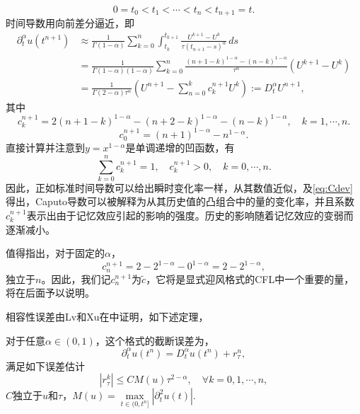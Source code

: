\[
0=t_0<t_1<\cdots<t_n<t_{n+1}=t.
\]
时间导数用向前差分逼近，即
\begin{align}
\partial_t^\alpha u (t^{n+1}) & \approx \frac 1 {\Gamma (1-\alpha)} \sum_{k=0}^n \int_{t_k}^{t_{k+1}} \frac{U^{k+1} - U^{k}}{
\tau(t_{n+1}-s)^\alpha}\,ds 
\nonumber \\
& =  \frac 1 {\Gamma (1-\alpha)(1-\alpha)} \sum_{k=0}^n \frac{(n+1-k)^{1-\alpha}-(n-k)^{1-\alpha}}{\tau^\alpha} (U^{k+1}-U^k) \nonumber \\
& =  \frac{1}{\Gamma(2-\alpha)\tau^\alpha} \left(U^{n+1}- \sum_{n=0}^k c^{n+1}_k U^k\right):=D_t^\alpha U^{n+1}, \label{eq:Cdev}
\end{align}
其中
\[
c^{n+1}_k = 2(n+1-k)^{1-\alpha}-(n+2-k)^{1-\alpha}-(n-k)^{1-\alpha}, \quad k=1,\cdots,n.
\]
\[
c^{n+1}_0=(n+1)^{1-\alpha}-n^{1-\alpha}.
\]
直接计算并注意到$y=x^{1-\alpha}$是单调递增的凹函数，有
\begin{equation}\label{cond:ck}
\sum_{k=0}^n c^{n+1}_k=1,\quad c^{n+1}_k >0, \quad k=0,\cdots,n.
\end{equation}
因此，正如标准时间导数可以给出瞬时变化率一样，从其数值近似，及\eqref{eq:Cdev}得出，Caputo导数可以被解释为从其历史值的凸组合中的量的变化率，并且系数$c_k^{n + 1}$表示出由于记忆效应引起的影响的强度。历史的影响随着记忆效应的变弱而逐渐减小。

值得指出，对于固定的$\alpha$，
\[
c^{n+1}_n=2-2^{1-\alpha}-0^{1-\alpha}=2-2^{1-\alpha},
\]
独立于$n$。因此，我们记$c^{n+1}_n$为$\tilde c$，它将是显式迎风格式的CFL中一个重要的量，将在后面予以说明。

相容性误差由Lv和Xu在中证明，如下述定理，
\begin{lem}
对于任意$\alpha\in(0,1)$，这个格式的截断误差为，
\begin{equation}
\partial^\alpha_{t} u (t^{n}) = D_t^\alpha u (t^{n})+ r^{n}_{\tau},
\end{equation}
满足如下误差估计
\begin{equation}
|r^k_\tau| \le CM(u)\tau^{2-\alpha}, \quad \forall k=0,1,\cdots, n,
\end{equation}
$C$独立于$u$和$\tau$，$M(u) = \max\limits_{t\in (0,t^n]}|\partial_t^2 u(t)|$.
\end{lem} 


